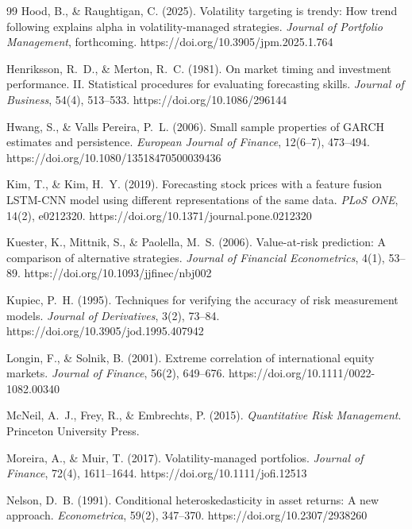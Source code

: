 \documentclass[12pt,a4paper]{article}
\begin{document}
\begin{thebibliography}{99}
Hood, B., \& Raughtigan, C. (2025). Volatility targeting is trendy: How trend following explains alpha in volatility-managed strategies. \textit{Journal of Portfolio Management}, forthcoming. https://doi.org/10.3905/jpm.2025.1.764

Henriksson, R.~D., \& Merton, R.~C. (1981). On market timing and investment performance. II. Statistical procedures for evaluating forecasting skills. \textit{Journal of Business}, 54(4), 513--533. https://doi.org/10.1086/296144

Hwang, S., \& Valls Pereira, P.~L. (2006). Small sample properties of GARCH estimates and persistence. \textit{European Journal of Finance}, 12(6--7), 473--494. https://doi.org/10.1080/13518470500039436

Kim, T., \& Kim, H.~Y. (2019). Forecasting stock prices with a feature fusion LSTM-CNN model using different representations of the same data. \textit{PLoS ONE}, 14(2), e0212320. https://doi.org/10.1371/journal.pone.0212320

Kuester, K., Mittnik, S., \& Paolella, M.~S. (2006). Value-at-risk prediction: A comparison of alternative strategies. \textit{Journal of Financial Econometrics}, 4(1), 53--89. https://doi.org/10.1093/jjfinec/nbj002

Kupiec, P.~H. (1995). Techniques for verifying the accuracy of risk measurement models. \textit{Journal of Derivatives}, 3(2), 73--84. https://doi.org/10.3905/jod.1995.407942

Longin, F., \& Solnik, B. (2001). Extreme correlation of international equity markets. \textit{Journal of Finance}, 56(2), 649--676. https://doi.org/10.1111/0022-1082.00340

McNeil, A.~J., Frey, R., \& Embrechts, P. (2015). \textit{Quantitative Risk Management}. Princeton University Press.

Moreira, A., \& Muir, T. (2017). Volatility-managed portfolios. \textit{Journal of Finance}, 72(4), 1611--1644. https://doi.org/10.1111/jofi.12513

Nelson, D.~B. (1991). Conditional heteroskedasticity in asset returns: A new approach. \textit{Econometrica}, 59(2), 347--370. https://doi.org/10.2307/2938260


\end{thebibliography}
\end{document}
